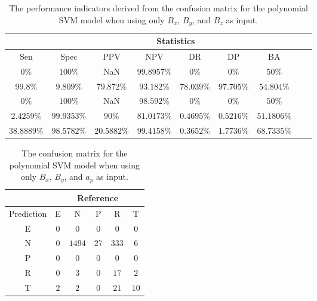 \begin{table}[!ht]
	\centering
	\begin{tabular}{|c|c|c|c|c|c|c|c|c|}
		\hline
		 & \multicolumn{7}{c|}{Statistics} \\ \hline
		Sen & Spec & PPV & NPV & DR & DP & BA \\ \hline
		$0\%$ & $100\%$ & NaN & $99.8957\%$ & $0\%$ & $0\%$ & $50\%$ \\ \hline
		$99.8\%$ & $9.809\%$ & $79.872\%$ & $93.182\%$ & $78.039\%$ & $97.705\%$ & $54.804\%$ \\ \hline
		$0\%$ & $100\%$ & NaN & $98.592\%$ & $0\%$ & $0\%$ & $50\%$ \\ \hline
		$2.4259\%$ & $99.9353\%$ & $90\%$ & $81.0173\%$ & $0.4695\%$ & $0.5216\%$ & $51.1806\%$ \\ \hline
		$38.8889\%$ & $98.5782\%$ & $20.5882\%$ & $99.4158\%$ & $0.3652\%$ & $1.7736\%$ & $68.7335\%$ \\ \hline
	\end{tabular}
	\caption{The performance indicators derived from the confusion matrix for the polynomial SVM model when using only $B_{x}$, $B_{y}$, and $B_{z}$ as input.}
	\label{tab:cs:coord:svmPoly}
\end{table}

\begin{table}[!ht]
	\centering
	\begin{tabular}{|c|c|c|c|c|c|}
		\hline
		 & \multicolumn{5}{|c|}{Reference} \\ \hline
		 Prediction & E & N & P & R & T \\ \hline
		 E & $0$ & $0$ & $0$ & $0$ & $0$ \\ \hline
		 N & $0$ & $1494$ & $27$ & $333$ & $6$ \\ \hline
		 P & $0$ & $0$ & $0$ & $0$ & $0$ \\ \hline
		 R & $0$ & $3$ & $0$ & $17$ & $2$ \\ \hline
		 T & $2$ & $2$ & $0$ & $21$ & $10$ \\ \hline
	\end{tabular}
	\caption{The confusion matrix for the polynomial SVM model when using only $B_{x}$, $B_{y}$, and $a_{p}$ as input.}
	\label{tab:cm:xyap:svmPoly}
\end{table}

